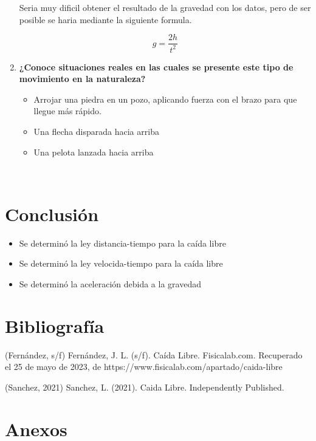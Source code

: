 \documentclass[11pt,twocolumn]{article}
\begin{document}
\begin{enumerate}
Seria muy dificil obtener el resultado de la gravedad con los datos, pero de ser posible se haria mediante la siguiente formula.

$$g=\frac{2h}{t^{2}}$$


\item \textbf{¿Conoce situaciones reales en las cuales se presente este tipo de movimiento en la naturaleza?}

\begin{itemize}
    \item Arrojar una piedra en un pozo, aplicando fuerza con el brazo para que llegue más rápido.

    \item Una flecha disparada hacia arriba 

    \item Una pelota lanzada hacia arriba 

    \
\end{itemize}
 
\end{enumerate}

\section{Conclusión}

\begin{itemize}
    \item Se determinó la ley distancia-tiempo para la caída libre
    \item Se determinó la ley velocida-tiempo para la caída libre
    \item Se determinó la aceleración debida a la gravedad
\end{itemize}


\section{Bibliografía}
\begin{thebibliography}{}
(Fernández, s/f)
Fernández, J. L. (s/f). Caída Libre. Fisicalab.com. Recuperado el 25 de mayo de 2023, de https://www.fisicalab.com/apartado/caida-libre

(Sanchez, 2021)
Sanchez, L. (2021). Caida Libre. Independently Published.




\clearpage 

\section{Anexos}



\end{thebibliography}{}
\end{document}
